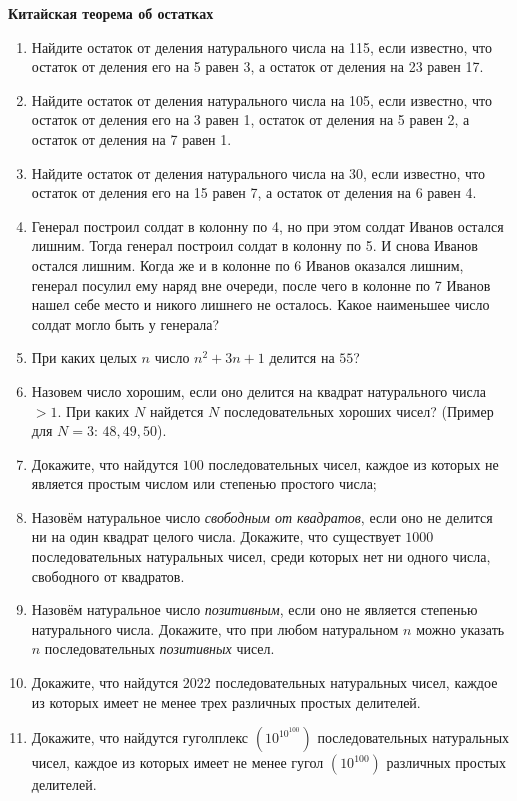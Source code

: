 \documentclass{article}
\begin{document}
\large
	
\begin{center}
	\textbf{Китайская теорема об остатках}
\end{center}

\begin{enumerate}[label*=\protect\fbox{\arabic{enumi}}]
	
\item Найдите остаток от деления натурального числа на 115, если известно, что остаток от деления его на 5 равен 3, а остаток от деления на 23 равен 17.

\item Найдите остаток от деления натурального числа на 105, если известно, что остаток от деления его на 3 равен 1, остаток от деления на 5 равен 2, а остаток от деления на 7 равен 1.

\item Найдите остаток от деления натурального числа на 30, если известно, что остаток от деления его на 15 равен 7, а остаток от деления на 6 равен 4.

\item Генерал построил солдат в колонну по 4, но при этом солдат Иванов остался лишним. Тогда генерал построил солдат в колонну по 5. И снова Иванов остался лишним. Когда же и в колонне по 6 Иванов оказался лишним, генерал посулил ему наряд вне очереди, после чего в колонне по 7 Иванов нашел себе место и никого лишнего не осталось. Какое наименьшее число солдат могло быть у генерала?

\item При каких целых $n$ число $n^2 + 3n + 1$ делится на $55$?

\item Назовем число хорошим, если оно делится на квадрат натурального числа $> 1$. При каких $N$ найдется $N$ последовательных хороших чисел? (Пример для $N = 3$: $48, 49, 50$).

\item Докажите, что найдутся $100$ последовательных чисел, каждое из которых не является простым числом или степенью простого числа;

\item Назовём натуральное число \textit{свободным от квадратов}, если оно не делится ни на один квадрат целого числа. Докажите, что существует $1000$ последовательных натуральных чисел, среди которых нет ни одного числа, свободного от квадратов.

\item Назовём натуральное число \textit{позитивным}, если оно не является степенью натурального числа. Докажите, что при любом натуральном $n$ можно указать $n$ последовательных \textit{позитивных} чисел.

\item Докажите, что найдутся $2022$ последовательных натуральных чисел, каждое из которых имеет не менее трех различных простых делителей.

\item Докажите, что найдутся гуголплекс $\left(10^{10^{100}}\right) $ последовательных натуральных чисел, каждое из которых имеет не менее гугол $\left(10^{100}\right)$ различных простых делителей.

\end{enumerate}
\end{document}
